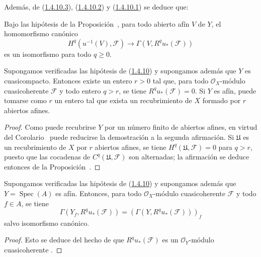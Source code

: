 Además, de (\hyperref[III.1.4.10.3]{1.4.10.3}), (\hyperref[III.1.4.10.2]{1.4.10.2}) y (\hyperref[III.1.4.10.1]{1.4.10.1}) se deduce que:
\begin{corollary}[1.4.11]
\label{III.1.4.11}
\label{III.1.4.11-fr}
Bajo las hipótesis de la Proposición~, para todo abierto afín $V$ de $Y$, el homomorfismo canónico
\begin{equation}
\label{III.1.4.11.1-fr}
\tag{1.4.11.1}
H^q(u^{-1}(V),\mathcal F)\longrightarrow
\Gamma(V,R^qu_*(\mathcal F))
\end{equation}
es un isomorfismo para todo $q\geq0$.
\end{corollary}

\begin{corollary}[1.4.12]
\label{III.1.4.12-fr}
Supongamos verificadas las hipótesis de \textup{(\hyperref[III.1.4.10-fr]{1.4.10})} y supongamos además que $Y$ es cuasicompacto.
Entonces existe un entero $r>0$ tal que, para todo $\mathcal O_X$-módulo cuasicoherente $\mathcal F$ y todo entero $q>r$, se tiene $R^qu_*(\mathcal F)=0$.
Si $Y$ es afín, puede tomarse como $r$ un entero tal que exista un recubrimiento de $X$ formado por $r$ abiertos afines.
\end{corollary}

\begin{proof}
Como puede recubrirse $Y$ por un número finito de abiertos afines, en virtud del Corolario~ puede reducirse la demostración a la segunda afirmación.
Si $\mathfrak U$ es un recubrimiento de $X$ por $r$ abiertos afines, se tiene $H^q(\mathfrak U,\mathcal F)=0$ para $q>r$, puesto que las cocadenas de $C^q(\mathfrak U,\mathcal F)$ son alternadas; la afirmación se deduce entonces de la Proposición~.
\end{proof}

\begin{corollary}[1.4.13]
\label{III.1.4.13-fr}
Supongamos verificadas las hipótesis de \textup{(\hyperref[III.1.4.10-fr]{1.4.10})} y supongamos además que $Y=\operatorname{Spec}(A)$ es afín.
Entonces, para todo $\mathcal O_X$-módulo cuasicoherente $\mathcal F$ y todo $f\in A$, se tiene
\[
\Gamma(Y_f,R^qu_*(\mathcal F))
=(\Gamma(Y,R^qu_*(\mathcal F)))_f
\]
salvo isomorfismo canónico.
\end{corollary}

\begin{proof}
Esto se deduce del hecho de que $R^qu_*(\mathcal F)$ es un $\mathcal O_Y$-módulo cuasicoherente .
\end{proof}

